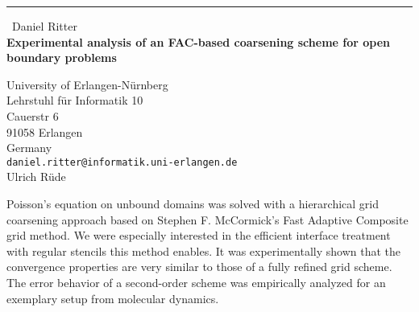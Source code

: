 \documentclass{report}
\begin{document}
\begin{center}
\rule{6in}{1pt} \
{\large Daniel Ritter \\
{\bf Experimental analysis of an FAC-based coarsening scheme for open boundary problems}}

University of Erlangen-N\"urnberg \\ Lehrstuhl f\"ur Informatik 10 \\ Cauerstr 6 \\ 91058 Erlangen \\ Germany
\\
{\tt daniel.ritter@informatik.uni-erlangen.de}\\
Ulrich R\"ude\end{center}

Poisson's equation on unbound domains was solved with a hierarchical grid
coarsening approach based on
Stephen F. McCormick's Fast Adaptive Composite grid method. We were
especially interested in the efficient interface treatment
with regular stencils this method enables. It was experimentally shown
that the convergence properties are very similar
to those of a fully refined grid scheme. The error behavior of a
second-order scheme was empirically analyzed for
an exemplary setup from molecular dynamics.
\end{document}
